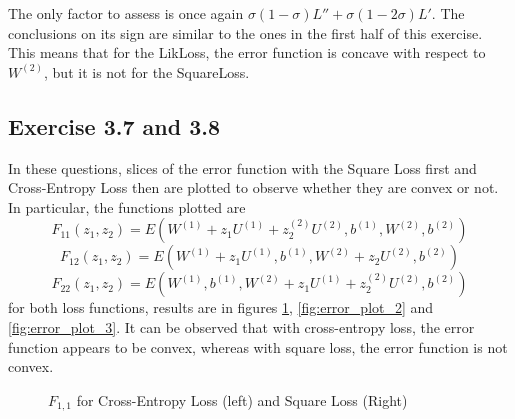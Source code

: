 \documentclass[fleqn]{report}
\begin{document}
The only factor to assess is once again $\sigma (1-\sigma) L'' + \sigma (1-2 \sigma) L'$. The conclusions on its sign are similar to the ones in the first half of this exercise. This means that for the LikLoss, the error function is concave with respect to $W^{(2)}$, but it is not for the SquareLoss.

\subsection*{Exercise 3.7 and 3.8}
In these questions, slices of the error function with the Square Loss first and Cross-Entropy Loss then are plotted to observe whether they are convex or not. In particular, the functions plotted are
\begin{equation}
    F_{11}(z_1, z_2) = E(W^{(1)} + z_1 U^{(1)} + z_2 ^{(2)} U^{(2)}, b^{(1)}, W^{(2)}, b^{(2)})
\end{equation}
\begin{equation}
    F_{12}(z_1, z_2) = E(W^{(1)} + z_1 U^{(1)}, b^{(1)}, W^{(2)} + z_2 U^{(2)}, b^{(2)})
\end{equation}
\begin{equation}
    F_{22}(z_1, z_2) = E(W^{(1)}, b^{(1)}, W^{(2)} + z_1 U^{(1)} + z_2 ^{(2)} U^{(2)}, b^{(2)})
\end{equation}
for both loss functions, results are in figures \ref{fig:error_plot_1}, \ref{fig:error_plot_2} and \ref{fig:error_plot_3}. It can be observed that with cross-entropy loss, the error function appears to be convex, whereas with square loss, the error function is not convex.
\begin{figure}[H]
    \centering
    \qquad
    \caption{$F_{1,1}$ for Cross-Entropy Loss (left) and Square Loss (Right)}
    \label{fig:error_plot_1}
\end{figure}
\end{document}
